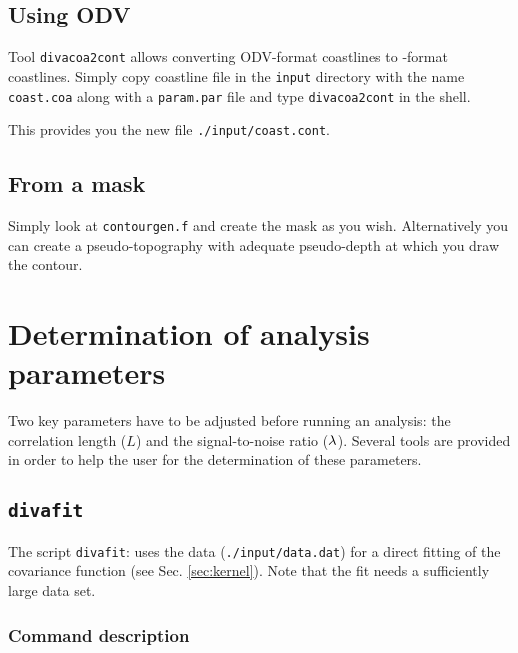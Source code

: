 \subsection{Using ODV}

Tool \texttt{divacoa2cont} allows converting ODV-format coastlines to \diva-format coastlines. Simply copy coastline file in the \texttt{input} directory with the name \texttt{coast.coa} along with a \texttt{param.par} file and type \texttt{divacoa2cont} in the shell. 

This provides you the new file \texttt{./input/coast.cont}.



\subsection{From a mask}

Simply look at \texttt{contourgen.f} and create the mask as you wish. Alternatively you can
create a pseudo-topography with adequate pseudo-depth at which you draw the contour.


\section{Determination of analysis parameters}

Two key parameters have to be adjusted before running an analysis: the correlation length ($L$) and the signal-to-noise ratio ($\lambda$). Several tools are provided in order to help the user for the determination of these parameters.


\subsection{\texttt{divafit} \label{sec:divafit}}

The script \texttt{divafit}: uses the data (\texttt{./input/data.dat}) for a direct fitting of the covariance function (see Sec. \ref{sec:kernel}). Note that the fit needs a sufficiently large data set.

\subsubsection{Command description}

